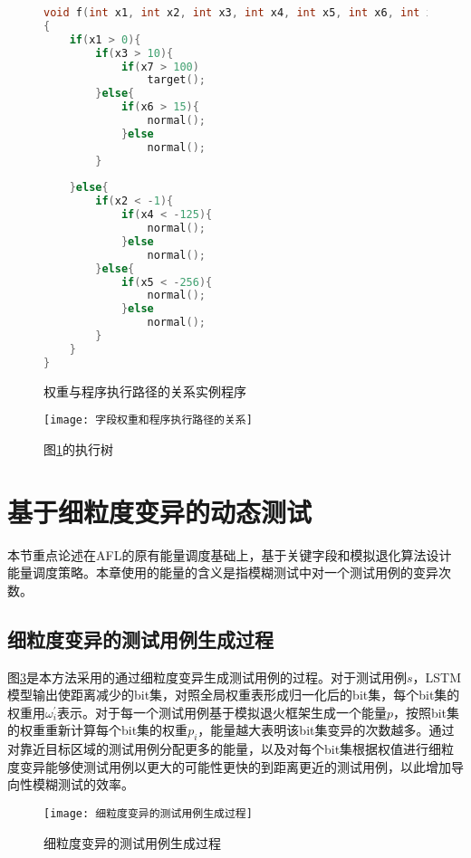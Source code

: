 \begin{figure}[h]
\begin{lstlisting}[language=C]
void f(int x1, int x2, int x3, int x4, int x5, int x6, int x7)
{
	if(x1 > 0){
		if(x3 > 10){
			if(x7 > 100)
				target();
		}else{
			if(x6 > 15){
				normal();
			}else
				normal();
		}
			
	}else{
		if(x2 < -1){
			if(x4 < -125){
				normal();
			}else
				normal();
		}else{
			if(x5 < -256){
				normal();
			}else
				normal();
		}
	}
}
\end{lstlisting}
\caption{权重与程序执行路径的关系实例程序}
\label{权重与程序执行路径的关系实例程序}
\end{figure}



\begin{figure}[htb]
\begin{center}
\texttt{[image: 字段权重和程序执行路径的关系]}
\end{center}
\caption{图\ref{权重与程序执行路径的关系实例程序}的执行树}
\label{字段权重和程序执行路径的关系}
\end{figure}


\section{基于细粒度变异的动态测试}
\label{基于字段权重的模糊测试能量调度策略}

本节重点论述在AFL的原有能量调度基础上，基于关键字段和模拟退化算法设计能量调度策略。本章使用的能量的含义是指模糊测试中对一个测试用例的变异次数。

\subsection{细粒度变异的测试用例生成过程}

图\ref{细粒度变异的测试用例生成过程}是本方法采用的通过细粒度变异生成测试用例的过程。对于测试用例$s$，LSTM模型输出使距离减少的bit集，对照全局权重表形成归一化后的bit集，每个bit集的权重用$\omega^{'}_{i}$表示。对于每一个测试用例基于模拟退火框架生成一个能量$p$，按照bit集的权重重新计算每个bit集的权重$p_i$，能量越大表明该bit集变异的次数越多。通过对靠近目标区域的测试用例分配更多的能量，以及对每个bit集根据权值进行细粒度变异能够使测试用例以更大的可能性更快的到距离更近的测试用例，以此增加导向性模糊测试的效率。

\begin{figure}[htb]
\begin{center}
\texttt{[image: 细粒度变异的测试用例生成过程]}
\end{center}
\caption{细粒度变异的测试用例生成过程}
\label{细粒度变异的测试用例生成过程}
\end{figure}


